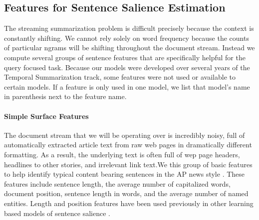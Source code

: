 %

\subsection{Features for Sentence Salience Estimation}

The streaming summarization problem is difficult precisely because the context
is constantly shifting. We cannot rely solely on word frequency because
the counts of particular ngrams will be shifting throughout the document
stream. Instead we compute several groups of sentence features that are
specifically helpful for the query focused task. Because our models were
developed over several years of the Temporal Summarization track, some
features were not used or available to certain models. If a feature
is only used in one model, we list that model's name in parenthesis next
to the feature name.



\paragraph{Simple Surface Features} 

The document stream that we will be operating over is incredibly noisy,
full of automatically extracted article text from raw web pages in 
dramatically different formatting. As a result, the underlying text is often
full of wep page headers, headlines to other stories, and irrelevant link text.We this group of basic features to help identify typical content bearing
sentences in the AP news style \citep{ap_style_guide}. These features 
include sentence length, the average number of capitalized words,
document position, sentence length in words, and the average number of 
named entities. Length and position features have been used previously in
other learning based models of sentence salience
\citep{kupiec1995trainable,conroy2001using}.

